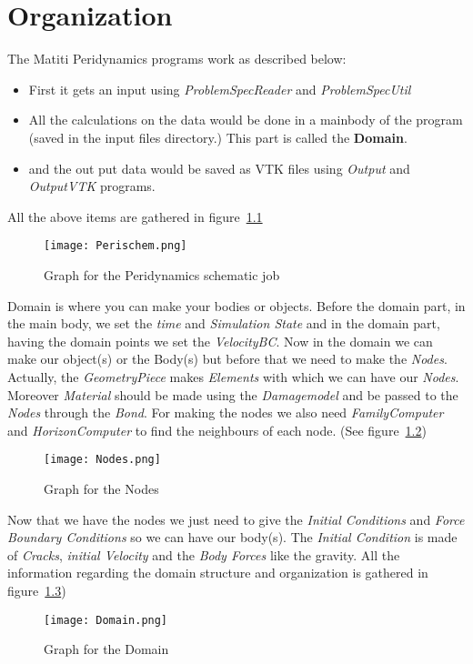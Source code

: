 \chapter{Organization}
\label{chap:Organization}

The Matiti Peridynamics programs work as described below:
\begin{itemize}
\item First it gets an input using \emph{ProblemSpecReader} and \emph{ProblemSpecUtil}
\item All the calculations on the data would be done in a mainbody of the program (saved in the input files directory.) This part is called the \textbf{Domain}.
\item and the out put data would be saved as VTK files using \emph{Output} and \emph{OutputVTK} programs. 
\end{itemize}

All the above items are gathered in figure~\ref{fig:Perischem}
\begin{figure}
  \texttt{[image: Perischem.png]}
  \caption{Graph for the Peridynamics schematic job}
  \label{fig:Perischem}
\end{figure}

Domain is where you can make your bodies or objects. Before the domain part, in the main body, we set the \emph{time} and \emph{Simulation State} and in the domain part, having the domain points we set the \emph{VelocityBC}. Now in the domain we can make our object(s) or the Body(s) but before that we need to make the \emph{Nodes}. \\
Actually, the \emph{GeometryPiece} makes \emph{Elements} with which we can have our \emph{Nodes}. Moreover \emph{Material} should be made using the \emph{Damagemodel} and be passed to the \emph{Nodes} through the \emph{Bond}. For making the nodes we also need \emph{FamilyComputer} and \emph{HorizonComputer} to find the neighbours of each node. (See figure~\ref{fig:Nodes})
\begin{figure}
  \texttt{[image: Nodes.png]}
  \caption{Graph for the Nodes}
  \label{fig:Nodes}
\end{figure}

Now that we have the nodes we just need to give the \emph{Initial Conditions} and \emph{Force Boundary Conditions} so we can have our body(s). The \emph{Initial Condition} is made of \emph{Cracks}, \emph{initial Velocity} and the \emph{Body Forces} like the gravity.
All the information regarding the domain structure and organization is gathered in figure~\ref{fig:Domain})
\begin{figure}
  \texttt{[image: Domain.png]}
  \caption{Graph for the Domain}
  \label{fig:Domain}
\end{figure}




